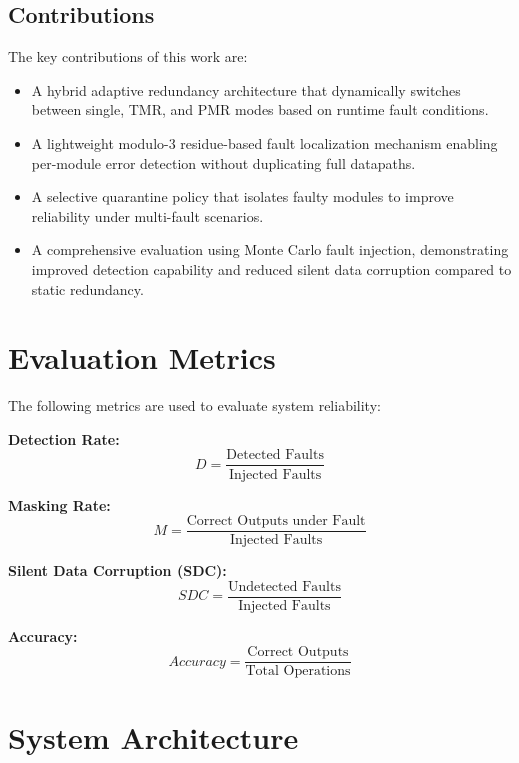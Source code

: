 \documentclass[conference]{IEEEtran}
\begin{document}
\subsection{Contributions}

The key contributions of this work are:

\begin{itemize}
\item A hybrid adaptive redundancy architecture that dynamically switches between single, TMR, and PMR modes based on runtime fault conditions.
\item A lightweight modulo-3 residue-based fault localization mechanism enabling per-module error detection without duplicating full datapaths.
\item A selective quarantine policy that isolates faulty modules to improve reliability under multi-fault scenarios.
\item A comprehensive evaluation using Monte Carlo fault injection, demonstrating improved detection capability and reduced silent data corruption compared to static redundancy.
\end{itemize}

\section{Evaluation Metrics}

The following metrics are used to evaluate system reliability:

\textbf{Detection Rate:}
\begin{equation}
D = \frac{\text{Detected Faults}}{\text{Injected Faults}}
\end{equation}

\textbf{Masking Rate:}
\begin{equation}
M = \frac{\text{Correct Outputs under Fault}}{\text{Injected Faults}}
\end{equation}

\textbf{Silent Data Corruption (SDC):}
\begin{equation}
SDC = \frac{\text{Undetected Faults}}{\text{Injected Faults}}
\end{equation}

\textbf{Accuracy:}
\begin{equation}
Accuracy = \frac{\text{Correct Outputs}}{\text{Total Operations}}
\end{equation}

\section{System Architecture}
\label{sec:arch}
\end{document}

